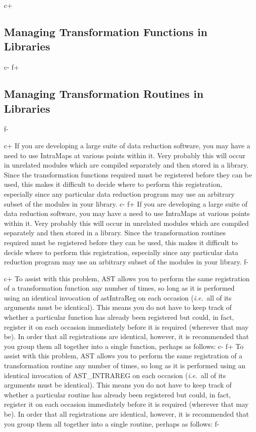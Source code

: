 \documentclass[twoside,11pt]{article}
\begin{document}
c+
\subsection{\label{ss:intramaplibrary}Managing Transformation Functions in Libraries}
c-
f+
\subsection{\label{ss:intramaplibrary}Managing Transformation Routines in Libraries}
f-

c+
If you are developing a large suite of data reduction software, you
may have a need to use IntraMaps at various points within it. Very
probably this will occur in unrelated modules which are compiled
separately and then stored in a library. Since the transformation
functions required must be registered before they can be used, this
makes it difficult to decide where to perform this registration,
especially since any particular data reduction program may use an
arbitrary subset of the modules in your library.
c-
f+
If you are developing a large suite of data reduction software, you
may have a need to use IntraMaps at various points within it. Very
probably this will occur in unrelated modules which are compiled
separately and then stored in a library. Since the transformation
routines required must be registered before they can be used, this
makes it difficult to decide where to perform this registration,
especially since any particular data reduction program may use an
arbitrary subset of the modules in your library.
f-

c+
To assist with this problem, AST allows you to perform the same
registration of a transformation function any number of times, so long
as it is performed using an identical invocation of astIntraReg on
each occasion ({\em{i.e.}}\ all of its arguments must be
identical). This means you do not have to keep track of whether a
particular function has already been registered but could, in fact,
register it on each occasion immediately before it is required
(wherever that may be). In order that all registrations are identical,
however, it is recommended that you group them all together into a
single function, perhaps as follows:
c-
f+
To assist with this problem, AST allows you to perform the same
registration of a transformation routine any number of times, so long
as it is performed using an identical invocation of AST\_INTRAREG on
each occasion ({\em{i.e.}}\ all of its arguments must be
identical). This means you do not have to keep track of whether a
particular routine has already been registered but could, in fact,
register it on each occasion immediately before it is required
(wherever that may be). In order that all registrations are identical,
however, it is recommended that you group them all together into a
single routine, perhaps as follows:
f-
\end{document}
